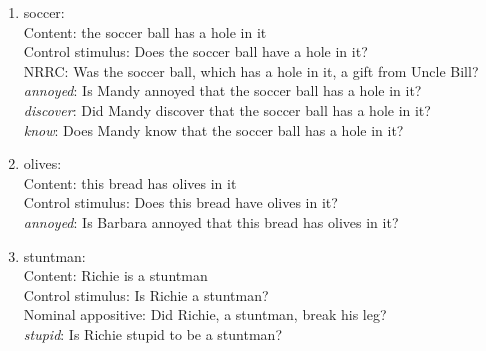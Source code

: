 \documentclass[11pt,fleqn]{article}
\newcommand{\6}{\mbox{$[\hspace*{-.6mm}[$}}
\newcommand{\9}{\mbox{$]\hspace*{-.6mm}]$}}
\begin{document}
\begin{enumerate}
\item soccer:  \\
     Content: the soccer ball has a hole in it\\
     Control stimulus: Does the soccer ball have a hole in it?\\
     NRRC: Was the soccer ball, which has a hole in it, a gift from Uncle Bill?\\
     {\em annoyed}: Is Mandy annoyed that the soccer ball has a hole in it?\\
     {\em discover}: Did Mandy discover that the soccer ball has a hole in it?\\
     {\em know}: Does Mandy know that the soccer ball has a hole in it?

\item olives:  \\
   	Content: this bread has olives in it\\
   	Control stimulus: Does this bread have olives in it?\\
   	{\em annoyed}: Is Barbara annoyed that this bread has olives in it?

\item stuntman:  \\
   	Content: Richie is a stuntman\\
   	Control stimulus: Is Richie a stuntman?\\
   	Nominal appositive: Did Richie, a stuntman, break his leg?\\
   	{\em stupid}: Is Richie stupid to be a stuntman?

\end{enumerate}



\end{document}
